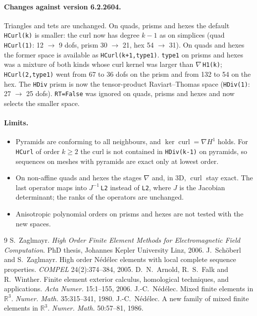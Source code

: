 \documentclass[10pt,a4paper]{article}
\newcommand{\code}[1]{\texttt{#1}}
\newcommand{\curl}{\operatorname{curl}}\renewcommand{\div}{\operatorname{div}}
\begin{document}
\paragraph{Changes against version 6.2.2604.}
Triangles and tets are unchanged. On quads, prisms and hexes the default \code{HCurl(k)} is smaller: the curl now has degree $k-1$ as on simplices (quad \code{HCurl(1)}: 12 $\to$ 9 dofs, prism 30 $\to$ 21, hex 54 $\to$ 31). On quads and hexes the former space is available as \code{HCurl(k+1,type1)}.
\code{type1} on prisms and hexes was a mixture of both kinds whose curl kernel was larger than $\nabla\,$\code{H1(k)}; \code{HCurl(2,type1)} went from 67 to 36 dofs on the prism and from 132 to 54 on the hex.
The \code{HDiv} prism is now the tensor-product Raviart--Thomas space (\code{HDiv(1)}: 27 $\to$ 25 dofs). \code{RT=False} was ignored on quads, prisms and hexes and now selects the smaller space.

\paragraph{Limits.}
\begin{itemize}\setlength\itemsep{1pt}
\item Pyramids are conforming to all neighbours, and $\ker\curl=\nabla H^1$ holds. For \code{HCurl} of order $k\ge2$ the curl is not contained in \code{HDiv(k-1)} on pyramids, so sequences on meshes with pyramids are exact only at lowest order.
\item On non-affine quads and hexes the stages $\nabla$ and, in 3D, $\curl$ stay exact. The last operator maps into $J^{-1}\,$\code{L2} instead of \code{L2}, where $J$ is the Jacobian determinant; the ranks of the operators are unchanged.
\item Anisotropic polynomial orders on prisms and hexes are not tested with the new spaces.
\end{itemize}

{\footnotesize\setlength{\itemsep}{0pt}
\begin{thebibliography}{9}\setlength{\itemsep}{1pt}
 S.~Zaglmayr. \emph{High Order Finite Element Methods for Electromagnetic Field Computation}. PhD thesis, Johannes Kepler University Linz, 2006.
 J.~Sch\"oberl and S.~Zaglmayr. High order N\'ed\'elec elements with local complete sequence properties. \emph{COMPEL} 24(2):374--384, 2005.
 D.~N.~Arnold, R.~S.~Falk and R.~Winther. Finite element exterior calculus, homological techniques, and applications. \emph{Acta Numer.} 15:1--155, 2006.
 J.-C.~N\'ed\'elec. Mixed finite elements in $\mathbb R^3$. \emph{Numer. Math.} 35:315--341, 1980.
 J.-C.~N\'ed\'elec. A new family of mixed finite elements in $\mathbb R^3$. \emph{Numer. Math.} 50:57--81, 1986.
\end{thebibliography}}
\end{document}
